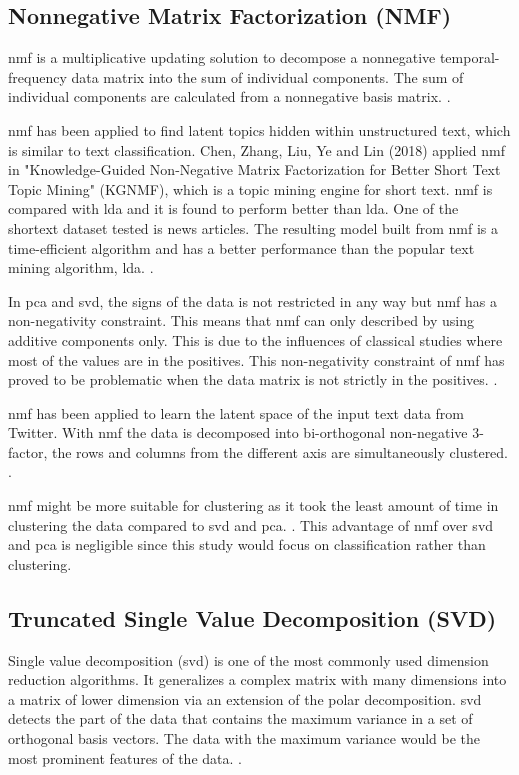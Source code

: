 \subsection{Nonnegative Matrix Factorization (NMF)}
\Ac{nmf} is a multiplicative updating solution to decompose a nonnegative temporal-frequency data matrix into the sum of individual components. The sum of individual components are calculated from a nonnegative basis matrix. \cite{nmfBook}.

\Ac{nmf} has been applied to find latent topics hidden within unstructured text, which is similar to text classification. Chen, Zhang, Liu, Ye and Lin (2018) applied \ac{nmf} in "Knowledge-Guided Non-Negative Matrix Factorization for Better Short Text Topic Mining" (KGNMF), which is a topic mining engine for short text. \Ac{nmf} is compared with \ac{lda} and it is found to perform better than \ac{lda}. One of the shortext dataset tested is news articles. The resulting model built from \ac{nmf} is a time-efficient algorithm and has a better performance than the popular text mining algorithm, \ac{lda}. \cite{shortTextNMF}.

In \ac{pca} and \ac{svd}, the signs of the data is not restricted in any way but \ac{nmf} has a non-negativity constraint. This means that \ac{nmf} can only described by using additive components only. This is due to the influences of classical studies where most of the values are in the positives. This non-negativity constraint of \ac{nmf} has proved to be problematic when the data matrix is not strictly in the positives. \cite{semiNmfPca}.

\Ac{nmf} has been applied to learn the latent space of the input text data from Twitter. With \ac{nmf} the data is decomposed into bi-orthogonal non-negative 3-factor, the rows and columns from the different axis are simultaneously clustered. \cite{nmfTwitter}.

\Ac{nmf} might be more suitable for clustering as it took the least amount of time in clustering the data compared to \ac{svd} and \ac{pca}. \cite{nmfClustering}. This advantage of \ac{nmf} over \ac{svd} and \ac{pca} is negligible since this study would focus on classification rather than clustering.\\


\subsection{Truncated Single Value Decomposition (SVD)}
Single value decomposition (\ac{svd}) is one of the most commonly used dimension reduction algorithms. It generalizes a complex matrix with many dimensions into a matrix of lower dimension via an extension of the polar decomposition. \Ac{svd} detects the part of the data that contains the maximum variance in a set of orthogonal basis vectors. The data with the maximum variance would be the most prominent features of the data. \cite{svdDef}.

